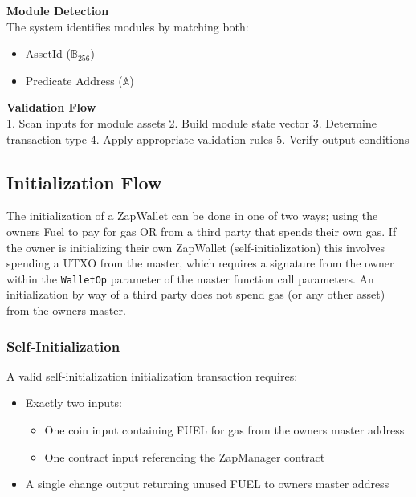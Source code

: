\textbf{Module Detection}\\
The system identifies modules by matching both:
\begin{itemize}
    \item AssetId ($\mathbb{B}_{256}$)
    \item Predicate Address ($\mathbb{A}$)
\end{itemize}

\textbf{Validation Flow}\\
1. Scan inputs for module assets
2. Build module state vector
3. Determine transaction type
4. Apply appropriate validation rules
5. Verify output conditions




\subsection{Initialization Flow}
\label{subsec:initialization:sec:zapmaster_predicate}
The initialization of a ZapWallet can be done in one of two ways; using the owners Fuel  to pay for gas OR from a third party that spends their own gas. If the owner is
initializing their own ZapWallet (self-initialization) this involves spending a  UTXO from the master, which requires a signature from the owner within
the \texttt{WalletOp} parameter of the master  function call parameters. An initialization by way of a third party does not spend gas (or any other asset) from the
owners master.

\subsubsection{Self-Initialization}
A valid self-initialization initialization transaction requires:
\begin{itemize}
    \item Exactly two inputs:
        \begin{itemize}
            \item One coin input containing FUEL  for gas from the owners master address
            \item One contract input referencing the ZapManager contract
        \end{itemize}
    \item A single change output returning unused FUEL  to owners master address
\end{itemize}


